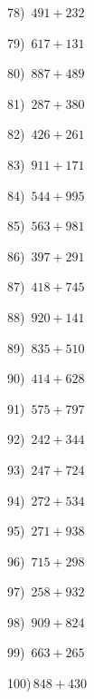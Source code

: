 \documentclass{article}
\begin{document}
\begin{multicols}{2}
78)$\,\,\,491+232$ \par 
79)$\,\,\,617+131$ \par 
80)$\,\,\,887+489$ \par 
81)$\,\,\,287+380$ \par 
82)$\,\,\,426+261$ \par 
83)$\,\,\,911+171$ \par 
84)$\,\,\,544+995$ \par 
85)$\,\,\,563+981$ \par 
86)$\,\,\,397+291$ \par 
87)$\,\,\,418+745$ \par 
88)$\,\,\,920+141$ \par 
89)$\,\,\,835+510$ \par 
90)$\,\,\,414+628$ \par 
91)$\,\,\,575+797$ \par 
92)$\,\,\,242+344$ \par 
93)$\,\,\,247+724$ \par 
94)$\,\,\,272+534$ \par 
95)$\,\,\,271+938$ \par 
96)$\,\,\,715+298$ \par 
97)$\,\,\,258+932$ \par 
98)$\,\,\,909+824$ \par 
99)$\,\,\,663+265$ \par 
100)$\,848+430$ \par 
\end{multicols} 
\end{document}
